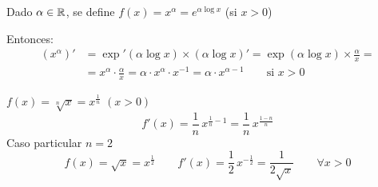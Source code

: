 \documentclass[11pt,a4paper]{article}
\begin{document}
\begin{observacion}
  Dado $\alpha\in\mathbb{R}$, se define $f(x)=x^\alpha=e^{\alpha\log x}$ \quad
  (si $x>0$)

  Entonces:
  \begin{align*}
    (x^\alpha)'&=\exp'(\alpha\log x)\times(\alpha\log x)'
      =\exp(\alpha\log x)\times\frac{\alpha}{x}=\\
    &=x^\alpha\cdot\frac{\alpha}{x}=\alpha\cdot x^\alpha\cdot x^{-1}
      =\alpha\cdot x^{\alpha-1}\qquad\text{si } x>0
  \end{align*}
\end{observacion}

\begin{observacion}
  $f(x)=\sqrt[n]{x}=x^{\frac{1}{n}}$ \quad $(x>0)$
  \[
    f'(x)=\frac{1}{n}\,x^{\frac{1}{n}-1}=\frac{1}{n}\,x^{\frac{1-n}{n}}
  \]
  Caso particular $n=2$
  \[
    f(x)=\sqrt{x}=x^{\frac12}\qquad
    f'(x)=\frac12\,x^{-\frac12}=\frac{1}{2\sqrt{x}}\qquad\forall x>0
  \]
\end{observacion}
\end{document}
